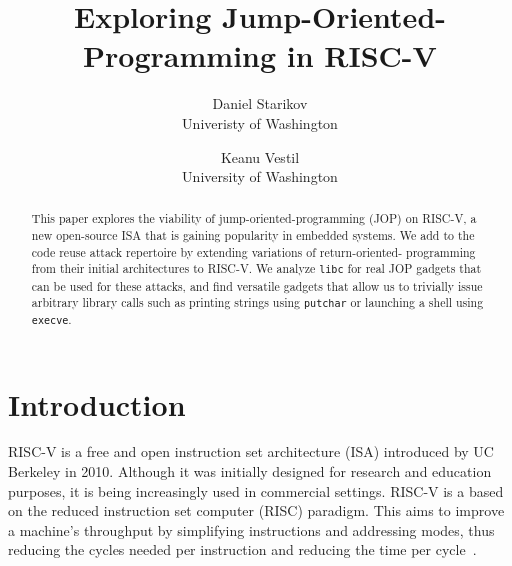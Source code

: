 

\date{}

\title{\Large \bf Exploring Jump-Oriented-Programming in RISC-V}

\author{
{\rm Daniel Starikov}\\
Univeristy of Washington
\and
{\rm Keanu Vestil}\\
University of Washington
} %

\maketitle

\begin{abstract}
This paper explores the viability of jump-oriented-programming (JOP) on RISC-V,
a new open-source ISA that is gaining popularity in embedded systems. We add to
the code reuse attack repertoire by extending variations of return-oriented-%
programming from their initial architectures to RISC-V. We analyze \verb|libc|
for real JOP gadgets that can be used for these attacks, and find versatile
gadgets that allow us to trivially issue arbitrary library calls such as
printing strings using \verb|putchar| or launching a shell using \verb|execve|.
\end{abstract}


\section{Introduction}

RISC-V is a free and open instruction set architecture (ISA) introduced by UC
Berkeley in 2010. Although it was initially designed for research and education
purposes, it is being increasingly used in commercial settings. RISC-V is a
based on the reduced instruction set computer (RISC) paradigm. This aims to
improve a machine's throughput by simplifying instructions and addressing modes,
thus reducing the cycles needed per instruction and reducing the time per cycle~\cite{patterson98risc}.

